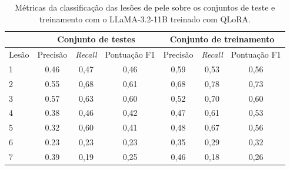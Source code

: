 \begin{table}[ht]
    \caption{\small Métricas da classificação das lesões de pele sobre os conjuntos de teste e treinamento com o
    \ac{LLaMA}-3.2-11B treinado com \ac{QLoRA}.}
    \centering
    \begin{tabular}{l|c|c|c|c|c|c}
        \hline
              & \multicolumn{3}{c|}{Conjunto de testes} & \multicolumn{3}{c}{Conjunto de treinamento}
        \\ \hline
        Lesão & Precisão                                & \textit{Recall}                             & Pontuação
        F1    & Precisão                                & \textit{Recall}                             & Pontuação
        F1
        \\
        \hline
        1     & 0.46                                    & 0,47                                        & 0,46      &
        0,59  & 0,53                                    & 0,56                                                      \\
        2     & 0.55                                    & 0,68                                        & 0,61      &
        0,68  & 0,78                                    & 0,73                                                      \\
        3     & 0.57                                    & 0,63                                        & 0,60      &
        0,52  & 0,70                                    & 0,60                                                      \\
        4     & 0.38                                    & 0,46                                        & 0,42      &
        0,47  & 0,61                                    & 0,53                                                      \\
        5     & 0.32                                    & 0,60                                        & 0,41      &
        0,48  & 0,67                                    & 0,56                                                      \\
        6     & 0.23                                    & 0,23                                        & 0,23      &
        0,35  & 0,29                                    & 0,32                                                      \\
        7     & 0.39                                    & 0,19                                        & 0,25      &
        0,46  & 0,18                                    & 0,26                                                      \\

\end{tabular}
\end{table}
